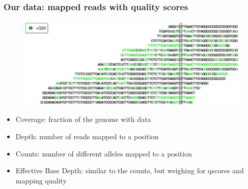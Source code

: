 \begin{frame}
\frametitle{Our data: mapped reads with quality scores}

	\begin{figure}
                \includegraphics[width=\textwidth]{Pics/mapped_reads.png}
        \end{figure}

	\begin{itemize}
		\item Coverage:	fraction of the genome with data
		\item Depth: number of reads mapped to a position
		\item Counts: number of different alleles mapped to a position
		\item Effective Base Depth: similar to the counts, but weighing for qscores and mapping quality
	\end{itemize}

\end{frame}



